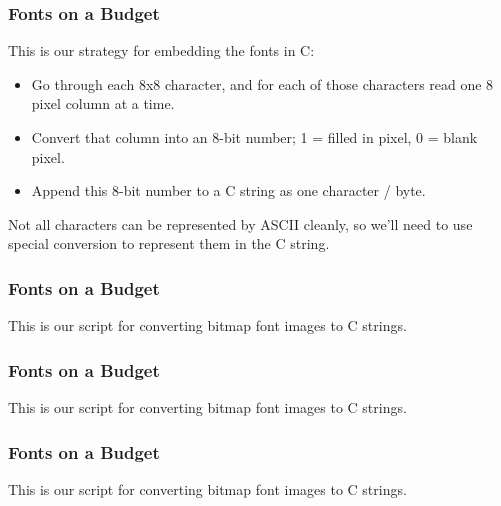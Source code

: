\documentclass[xcolor]{beamer}
\begin{document}
\begin{frame}
	\frametitle{Fonts on a Budget}
	\pause
	
	This is our strategy for embedding the fonts in C:
	
	\begin{itemize}
		\item Go through each 8x8 character, and for each of those characters read one 8 pixel column at a time.
		\item Convert that column into an 8-bit number; 1 = filled in pixel, 0 = blank pixel.
		\item Append this 8-bit number to a C string as one character / byte.
	\end{itemize}
	
	Not all characters can be represented by ASCII cleanly, so we'll need to use special conversion to represent them in the C string.
\end{frame}

\begin{frame}
	\frametitle{Fonts on a Budget}
	\pause
	
	
	
	This is our script for converting bitmap font images to C strings.
\end{frame}

\begin{frame}
	\frametitle{Fonts on a Budget}
	\pause
	
	
	
	This is our script for converting bitmap font images to C strings.
\end{frame}

\begin{frame}
	\frametitle{Fonts on a Budget}
	\pause
	
	
	
	This is our script for converting bitmap font images to C strings.
\end{frame}
\end{document}
